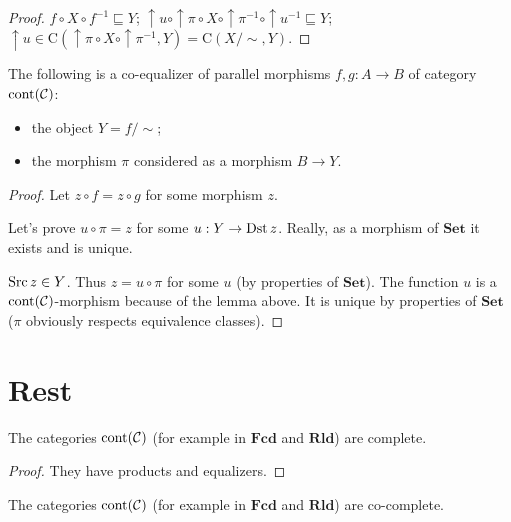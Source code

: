 \begin{proof}
  $f \circ X \circ f^{- 1} \sqsubseteq Y$; $\uparrow u \circ \uparrow \pi
  \circ X \circ \uparrow \pi^{- 1} \circ \uparrow u^{- 1} \sqsubseteq Y$;
  $\uparrow u \in \mathrm{C} (\uparrow \pi \circ X \circ \uparrow \pi^{- 1} ,
  Y) = \mathrm{C} (X / \sim , Y)$.
\end{proof}

\begin{thm}
  The following is a co-equalizer of parallel morphisms $f, g : A \rightarrow
  B$ of category $\operatorname{cont} (\mathcal{C})$:
  \begin{itemize}
    \item the object $Y = f / \sim$;
    
    \item the morphism $\pi$ considered as a morphism $B \rightarrow Y$.
  \end{itemize}
\end{thm}

\begin{proof}
  Let $z \circ f = z \circ g$ for some morphism $z$.
  
  Let's prove $u \circ \pi = z$ for some $u : Y \rightarrow \operatorname{Dst} z$.
  Really, as a morphism of $\mathbf{Set}$ it exists and is unique.
  
  $\operatorname{Src} z \in Y$. Thus $z = u \circ \pi$ for some $u$ (by properties of
  $\mathbf{Set}$). The function $u$ is a $\operatorname{cont}
  (\mathcal{C})$-morphism because of the lemma above. It is unique by
  properties of $\mathbf{Set}$ ($\pi$ obviously respects equivalence
  classes).
\end{proof}

\section{Rest}

\begin{thm}
  The categories $\operatorname{cont} (\mathcal{C})$ (for example in
  $\mathbf{Fcd}$ and $\mathbf{Rld}$) are complete.
\end{thm}

\begin{proof}
  They have products and equalizers.
\end{proof}

\begin{thm}
  The categories $\operatorname{cont} (\mathcal{C})$ (for example in
  $\mathbf{Fcd}$ and $\mathbf{Rld}$) are co-complete.
\end{thm}

